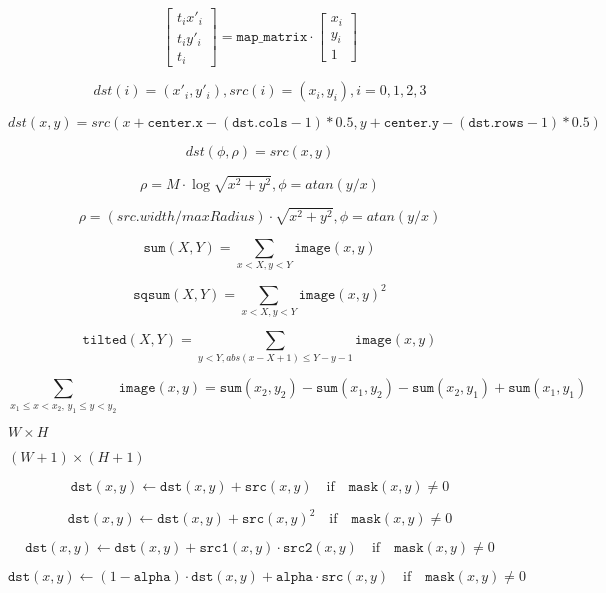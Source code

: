 \documentclass{article}
\begin{document}
\[\begin{bmatrix} t_i x'_i \\ t_i y'_i \\ t_i \end{bmatrix} = \texttt{map\_matrix} \cdot \begin{bmatrix} x_i \\ y_i \\ 1 \end{bmatrix}\]
\pagebreak

\[dst(i)=(x'_i,y'_i), src(i)=(x_i, y_i), i=0,1,2,3\]
\pagebreak

\[dst(x, y) = src(x +  \texttt{center.x} - ( \texttt{dst.cols} -1)*0.5, y +  \texttt{center.y} - ( \texttt{dst.rows} -1)*0.5)\]
\pagebreak

\[dst( \phi , \rho ) = src(x,y)\]
\pagebreak

\[\rho = M  \cdot \log{\sqrt{x^2 + y^2}} , \phi =atan(y/x)\]
\pagebreak

\[\rho = (src.width/maxRadius)  \cdot \sqrt{x^2 + y^2} , \phi =atan(y/x)\]
\pagebreak

\[\texttt{sum} (X,Y) =  \sum _{x<X,y<Y}  \texttt{image} (x,y)\]
\pagebreak

\[\texttt{sqsum} (X,Y) =  \sum _{x<X,y<Y}  \texttt{image} (x,y)^2\]
\pagebreak

\[\texttt{tilted} (X,Y) =  \sum _{y<Y,abs(x-X+1) \leq Y-y-1}  \texttt{image} (x,y)\]
\pagebreak

\[\sum _{x_1 \leq x < x_2,  \, y_1  \leq y < y_2}  \texttt{image} (x,y) =  \texttt{sum} (x_2,y_2)- \texttt{sum} (x_1,y_2)- \texttt{sum} (x_2,y_1)+ \texttt{sum} (x_1,y_1)\]
\pagebreak

$W \times H$
\pagebreak

$(W+1)\times (H+1)$
\pagebreak

\[\texttt{dst} (x,y)  \leftarrow \texttt{dst} (x,y) +  \texttt{src} (x,y)  \quad \text{if} \quad \texttt{mask} (x,y)  \ne 0\]
\pagebreak

\[\texttt{dst} (x,y)  \leftarrow \texttt{dst} (x,y) +  \texttt{src} (x,y)^2  \quad \text{if} \quad \texttt{mask} (x,y)  \ne 0\]
\pagebreak

\[\texttt{dst} (x,y)  \leftarrow \texttt{dst} (x,y) +  \texttt{src1} (x,y)  \cdot \texttt{src2} (x,y)  \quad \text{if} \quad \texttt{mask} (x,y)  \ne 0\]
\pagebreak

\[\texttt{dst} (x,y)  \leftarrow (1- \texttt{alpha} )  \cdot \texttt{dst} (x,y) +  \texttt{alpha} \cdot \texttt{src} (x,y)  \quad \text{if} \quad \texttt{mask} (x,y)  \ne 0\]
\pagebreak
\end{document}
